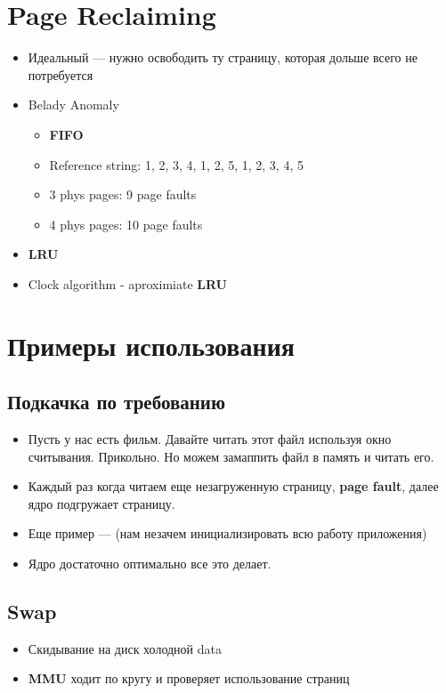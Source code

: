 \documentclass[../../lectures.tex]{subfiles}
\begin{document}
\section{Page Reclaiming}
\begin{itemize}
    \item Идеальный --- нужно освободить ту страницу, которая дольше всего не потребуется
    \item Belady Anomaly
          \begin{itemize}
            \item \textbf{FIFO}
            \item Reference string: 1, 2, 3, 4, 1, 2, 5, 1, 2, 3, 4, 5
            \item 3 phys pages: 9 page faults
            \item 4 phys pages: 10 page faults
          \end{itemize}
    \item \textbf{LRU}
    \item Clock algorithm - aproximiate \textbf{LRU}
\end{itemize}

\section{Примеры использования}
\subsection{Подкачка по требованию}
\begin{itemize}
    \item Пусть у нас есть фильм. Давайте читать этот файл используя
          окно считывания. Прикольно. Но можем замаппить файл в память 
          и читать его.
    \item Каждый раз когда читаем еще незагруженную страницу, \textbf{page fault},
          далее ядро подгружает страницу.
    \item Еще пример ---  (нам незачем инициализировать всю работу приложения)
    \item Ядро достаточно оптимально все это делает.
\end{itemize}

\subsection{Swap}
\begin{itemize}
    \item Скидывание на диск холодной data
    \item \textbf{MMU} ходит по кругу и проверяет использование страниц
\end{itemize}
\end{document}
